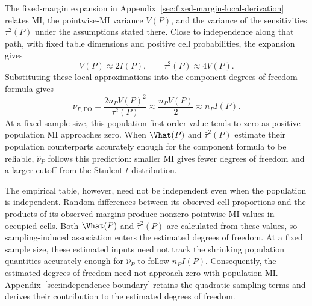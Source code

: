 The fixed-margin expansion in Appendix~\ref{sec:fixed-margin-local-derivation}
relates MI, the pointwise-MI variance \(V(P)\), and the variance of the
sensitivities \(\tau^2(P)\) under the assumptions stated there. Close to
independence along that path, with fixed table dimensions and positive
cell probabilities, the expansion gives
\begin{equation}
 V(P)\approx 2I(P),
 \qquad \tau^2(P)\approx4V(P).
 \label{eq:near-independent-moments}
\end{equation}
Substituting these local approximations into
the component degrees-of-freedom formula gives
\begin{equation}
 \nu_{P,\mathrm{FO}}=\frac{2n_PV(P)^2}{\tau^2(P)}
 \approx\frac{n_PV(P)}{2}
 \approx n_PI(P).
 \label{eq:near-independent-df}
\end{equation}
At a fixed sample size, this population first-order value tends to zero
as positive population MI approaches zero. When \(\Vhat(P)\) and
\(\widehat\tau^2(P)\) estimate their population counterparts accurately
enough for the component formula to be reliable, \(\widehat\nu_P\) follows this
prediction: smaller MI gives fewer degrees of freedom and a larger cutoff
from the Student \(t\) distribution.

The empirical table, however, need not be independent even when the
population is independent. Random differences between its observed cell
proportions and the products of its observed margins produce nonzero
pointwise-MI values in occupied cells. Both \(\Vhat(P)\) and \(\widehat\tau^2(P)\) are
calculated from these values, so sampling-induced association enters the
estimated degrees of freedom. At a fixed sample size, these estimated
inputs need not track the shrinking population quantities accurately
enough for \(\widehat\nu_P\) to follow \(n_PI(P)\). Consequently, the
estimated degrees of freedom need not approach zero with population MI.
Appendix~\ref{sec:independence-boundary} retains the quadratic sampling
terms and derives their contribution to the estimated degrees of freedom.

